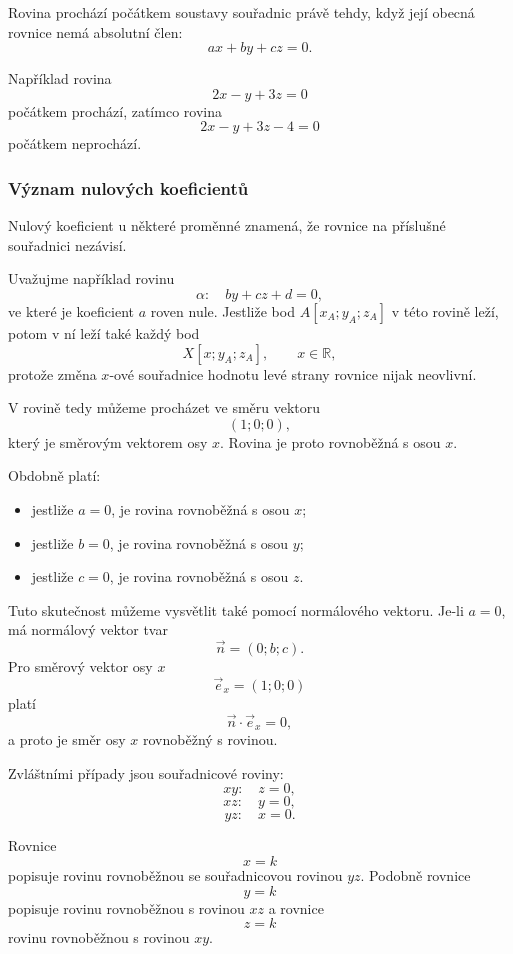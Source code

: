 \begin{remark}
    Rovina prochází počátkem soustavy souřadnic právě tehdy, když její
    obecná rovnice nemá absolutní člen:
    \[
        ax+by+cz=0.
    \]
\end{remark}

Například rovina
\[
    2x-y+3z=0
\]
počátkem prochází, zatímco rovina
\[
    2x-y+3z-4=0
\]
počátkem neprochází.

\subsubsection{Význam nulových koeficientů}
\label{subsubsec:Zero_coefficients_general_plane}

Nulový koeficient u některé proměnné znamená, že rovnice na příslušné
souřadnici nezávisí.

Uvažujme například rovinu
\[
    \alpha:\quad by+cz+d=0,
\]
ve které je koeficient $a$ roven nule. Jestliže bod $A[x_A;y_A;z_A]$
v této rovině leží, potom v ní leží také každý bod
\[
    X[x;y_A;z_A],
    \qquad
    x\in\mathbb{R},
\]
protože změna $x$-ové souřadnice hodnotu levé strany rovnice nijak
neovlivní.

V rovině tedy můžeme procházet ve směru vektoru
\[
    (1;0;0),
\]
který je směrovým vektorem osy $x$. Rovina je proto rovnoběžná s osou
$x$.

Obdobně platí:

\begin{itemize}
    \item jestliže $a=0$, je rovina rovnoběžná s osou $x$;
    \item jestliže $b=0$, je rovina rovnoběžná s osou $y$;
    \item jestliže $c=0$, je rovina rovnoběžná s osou $z$.
\end{itemize}

Tuto skutečnost můžeme vysvětlit také pomocí normálového vektoru. Je-li
$a=0$, má normálový vektor tvar
\[
    \vec{n}=(0;b;c).
\]
Pro směrový vektor osy $x$
\[
    \vec{e}_x=(1;0;0)
\]
platí
\[
    \vec{n}\cdot\vec{e}_x=0,
\]
a proto je směr osy $x$ rovnoběžný s rovinou.

Zvláštními případy jsou souřadnicové roviny:
\[
    xy:\quad z=0,
\]
\[
    xz:\quad y=0,
\]
\[
    yz:\quad x=0.
\]

Rovnice
\[
    x=k
\]
popisuje rovinu rovnoběžnou se souřadnicovou rovinou $yz$. Podobně
rovnice
\[
    y=k
\]
popisuje rovinu rovnoběžnou s rovinou $xz$ a rovnice
\[
    z=k
\]
rovinu rovnoběžnou s rovinou $xy$.

